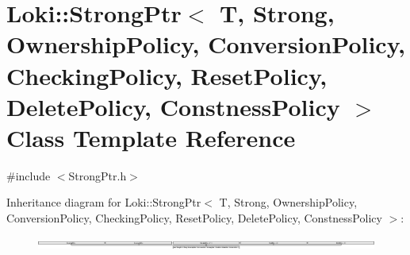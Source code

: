 \hypertarget{classLoki_1_1StrongPtr}{}\section{Loki\+:\+:Strong\+Ptr$<$ T, Strong, Ownership\+Policy, Conversion\+Policy, Checking\+Policy, Reset\+Policy, Delete\+Policy, Constness\+Policy $>$ Class Template Reference}
\label{classLoki_1_1StrongPtr}


{\ttfamily \#include $<$Strong\+Ptr.\+h$>$}

Inheritance diagram for Loki\+:\+:Strong\+Ptr$<$ T, Strong, Ownership\+Policy, Conversion\+Policy, Checking\+Policy, Reset\+Policy, Delete\+Policy, Constness\+Policy $>$\+:\begin{figure}[H]
\begin{center}
\leavevmode
\includegraphics[height=0.299866cm]{classLoki_1_1StrongPtr}
\end{center}
\end{figure}
